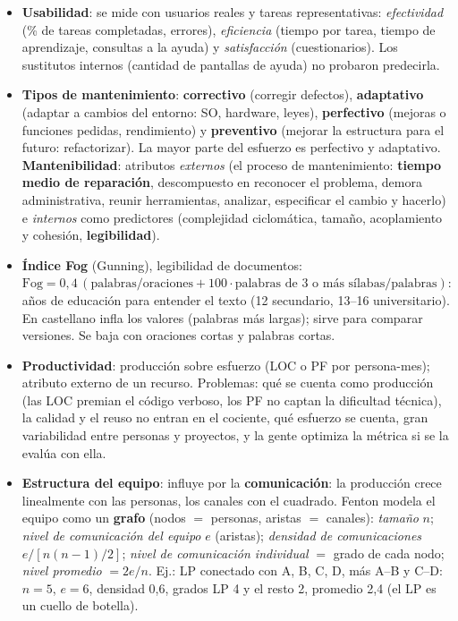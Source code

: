 \documentclass[11pt,a4paper]{article}
\begin{document}
\begin{itemize}
  \item \textbf{Usabilidad}: se mide con usuarios reales y tareas representativas: \emph{efectividad}
  (\% de tareas completadas, errores), \emph{eficiencia} (tiempo por tarea, tiempo de aprendizaje, consultas a
  la ayuda) y \emph{satisfacción} (cuestionarios). Los sustitutos internos (cantidad de pantallas de ayuda) no
  probaron predecirla.
  \item \textbf{Tipos de mantenimiento}: \textbf{correctivo} (corregir defectos), \textbf{adaptativo} (adaptar a
  cambios del entorno: SO, hardware, leyes), \textbf{perfectivo} (mejoras o funciones pedidas, rendimiento) y
  \textbf{preventivo} (mejorar la estructura para el futuro: refactorizar). La mayor parte del esfuerzo es
  perfectivo y adaptativo. \textbf{Mantenibilidad}: atributos \emph{externos} (el proceso de mantenimiento:
  \textbf{tiempo medio de reparación}, descompuesto en reconocer el problema, demora administrativa, reunir
  herramientas, analizar, especificar el cambio y hacerlo) e \emph{internos} como predictores (complejidad
  ciclomática, tamaño, acoplamiento y cohesión, \textbf{legibilidad}).
  \item \textbf{Índice Fog} (Gunning), legibilidad de documentos: $\text{Fog} = 0{,}4\,(\text{palabras/oraciones}
  + 100 \cdot \text{palabras de 3 o más sílabas/palabras})$: años de educación para entender el texto (12
  secundario, 13--16 universitario). En castellano infla los valores (palabras más largas); sirve para comparar
  versiones. Se baja con oraciones cortas y palabras cortas.
  \item \textbf{Productividad}: producción sobre esfuerzo (LOC o PF por persona-mes); atributo externo de un
  recurso. Problemas: qué se cuenta como producción (las LOC premian el código verboso, los PF no captan la
  dificultad técnica), la calidad y el reuso no entran en el cociente, qué esfuerzo se cuenta, gran
  variabilidad entre personas y proyectos, y la gente optimiza la métrica si se la evalúa con ella.
  \item \textbf{Estructura del equipo}: influye por la \textbf{comunicación}: la producción crece linealmente con
  las personas, los canales con el cuadrado. Fenton modela el equipo como un \textbf{grafo} (nodos $=$ personas,
  aristas $=$ canales): \emph{tamaño} $n$; \emph{nivel de comunicación del equipo} $e$ (aristas);
  \emph{densidad de comunicaciones} $e / [n(n-1)/2]$; \emph{nivel de comunicación individual} $=$ grado de cada
  nodo; \emph{nivel promedio} $= 2e/n$. Ej.: LP conectado con A, B, C, D, más A--B y C--D: $n = 5$, $e = 6$,
  densidad 0,6, grados LP 4 y el resto 2, promedio 2,4 (el LP es un cuello de botella).
\end{itemize}
\end{document}

